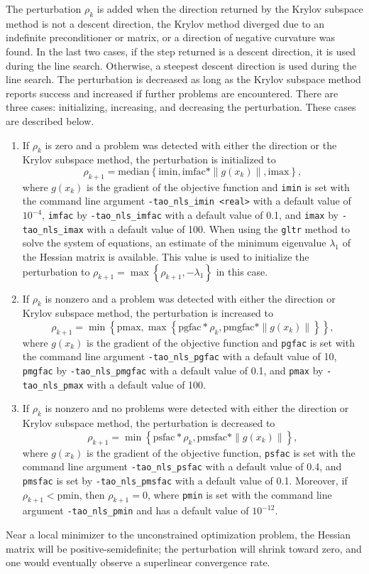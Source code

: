 \documentclass[]{book}
\begin{document}
The perturbation $\rho_k$ is added when the direction returned by the
Krylov subspace method is not a descent direction, the Krylov method
diverged due to an indefinite preconditioner or matrix, or a direction of 
negative curvature was found.  In the last two cases, if the step returned
is a descent direction, it is used during the line search.  Otherwise, a
steepest descent direction is used during the line search.  The perturbation
is decreased as long as the Krylov subspace method reports success and 
increased if further problems are encountered.  There are three cases:
initializing, increasing, and decreasing the perturbation.  These cases
are described below.
\begin{enumerate}
\item If $\rho_k$ is zero and a problem was detected with either the
direction or the Krylov subspace method, the perturbation is initialized to
\[
\rho_{k+1} = \mbox{median}\left\{\mbox{imin}, \mbox{imfac} * \|g(x_k)\|, \mbox{imax}\right\},
\]
where $g(x_k)$ is the gradient of the objective function and {\tt imin} is set 
with the command line argument {\tt -tao\_nls\_imin <real>} with a default 
value of $10^{-4}$, {\tt imfac} by {\tt -tao\_nls\_imfac} with a default 
value of 0.1, and {\tt imax} by {\tt -tao\_nls\_imax} with a default value 
of 100.  
When using the {\tt gltr} method to solve the system of equations, an
estimate of the minimum eigenvalue $\lambda_1$ of the Hessian matrix 
is available.  This value is used to initialize the perturbation to
$\rho_{k+1} = \max\left\{\rho_{k+1}, -\lambda_1\right\}$ in this
case.
\item If $\rho_k$ is nonzero and a problem was detected with either the 
direction or Krylov subspace method, the perturbation is increased to 
\[
\rho_{k+1} = \min\left\{\mbox{pmax}, \max\left\{\mbox{pgfac} * \rho_k, \mbox{pmgfac} * \|g(x_k)\|\right\}\right\},
\]
where $g(x_k)$ is the gradient of the objective function and {\tt pgfac} is set 
with the command line argument {\tt -tao\_nls\_pgfac}
with a default value of 10, {\tt pmgfac} by {\tt -tao\_nls\_pmgfac} with a
default value of 0.1, and {\tt pmax} by {\tt -tao\_nls\_pmax} with a default
value of 100.
\item If $\rho_k$ is nonzero and no problems were detected with either
the direction or Krylov subspace method, the perturbation is decreased to
\[
\rho_{k+1} = \min\left\{\mbox{psfac} * \rho_k, \mbox{pmsfac} * \|g(x_k)\|\right\},
\]
where $g(x_k)$ is the gradient of the objective function, {\tt psfac} is set 
with the command line argument {\tt -tao\_nls\_psfac}
with a default value of 0.4, and {\tt pmsfac} is set by {\tt -tao\_nls\_pmsfac}
with a default value of 0.1.  Moreover, if $\rho_{k+1} < \mbox{pmin}$, then 
$\rho_{k+1} = 0$, where {\tt pmin} is set with the command line argument 
{\tt -tao\_nls\_pmin} and has a default value of $10^{-12}$.
\end{enumerate}
Near a local minimizer to the unconstrained optimization problem, the
Hessian matrix will be positive-semidefinite; the perturbation will 
shrink toward zero, and one would eventually observe a superlinear
convergence rate.
\end{document}
